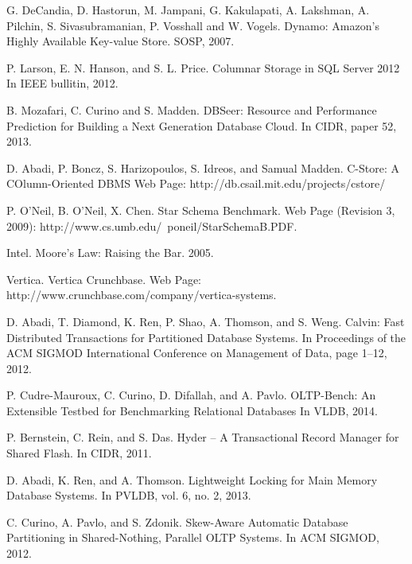 \begin{thebibliography}{1}
G. DeCandia, D. Hastorun, M. Jampani, G. Kakulapati, A. Lakshman, A. Pilchin, S. Sivasubramanian, P. Vosshall and W. Vogels.
Dynamo: Amazon's Highly Available Key-value Store.
SOSP, 2007.


P. Larson, E. N. Hanson, and S. L. Price.
Columnar Storage in SQL Server 2012
In IEEE bullitin, 2012.


B. Mozafari, C. Curino and S. Madden.
DBSeer: Resource and Performance Prediction for Building a Next Generation Database Cloud.
In CIDR, paper 52, 2013.

D. Abadi, P. Boncz, S. Harizopoulos, S. Idreos, and Samual Madden.
C-Store: A COlumn-Oriented DBMS
Web Page: http://db.csail.mit.edu/projects/cstore/


P. O'Neil, B. O'Neil, X. Chen.
Star Schema Benchmark.
Web Page (Revision 3, 2009): http://www.cs.umb.edu/~poneil/StarSchemaB.PDF.


Intel.
Moore's Law: Raising the Bar.
2005.


Vertica.
Vertica Crunchbase.
Web Page: http://www.crunchbase.com/company/vertica-systems.

D. Abadi, T. Diamond, K. Ren, P. Shao, A. Thomson, and S. Weng.
Calvin: Fast Distributed Transactions for Partitioned Database Systems. 
In Proceedings of the ACM SIGMOD International Conference on Management of Data, page 1–12, 2012.

P. Cudre-Mauroux, C. Curino, D. Difallah, and A. Pavlo.
OLTP-Bench: An Extensible Testbed for Benchmarking Relational Databases
In VLDB, 2014.

P. Bernstein, C. Rein, and S. Das. 
Hyder – A Transactional Record Manager for Shared Flash. 
In CIDR, 2011.

D. Abadi, K. Ren, and A. Thomson.
Lightweight Locking for Main Memory Database Systems.
In PVLDB, vol. 6, no. 2, 2013.

C. Curino, A. Pavlo, and S. Zdonik.
Skew-Aware Automatic Database Partitioning in Shared-Nothing, Parallel OLTP Systems.
In ACM SIGMOD, 2012.





\end{thebibliography}


